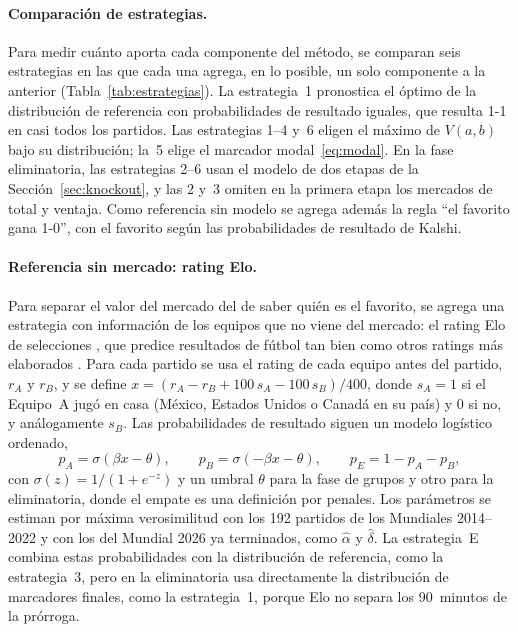 \documentclass[12pt]{article}
\theoremstyle{plain}
\theoremstyle{remark}
\begin{document}
\paragraph{Comparación de estrategias.}
Para medir cuánto aporta cada componente del método, se comparan seis
estrategias en las que cada una agrega, en lo posible, un solo
componente a la anterior (Tabla~\ref{tab:estrategias}).
La estrategia~1 pronostica el óptimo de la distribución de referencia
con probabilidades de resultado iguales, que resulta 1-1 en casi todos
los partidos.
Las estrategias 1--4 y~6 eligen el máximo de $V(a,b)$ bajo su
distribución; la~5 elige el marcador modal~\eqref{eq:modal}.
En la fase eliminatoria, las estrategias 2--6 usan el modelo de dos
etapas de la Sección~\ref{sec:knockout}, y las 2 y~3 omiten en la
primera etapa los mercados de total y ventaja.
Como referencia sin modelo se agrega además la regla ``el favorito
gana 1-0'', con el favorito según las probabilidades de resultado de
Kalshi.

\paragraph{Referencia sin mercado: rating Elo.}
Para separar el valor del mercado del de saber quién es el favorito,
se agrega una estrategia con información de los equipos que no viene
del mercado: el rating Elo de selecciones \citep{eloratings}, que
predice resultados de fútbol tan bien como otros ratings más
elaborados \citep{hvattum2010}.
Para cada partido se usa el rating de cada equipo antes del partido,
$r_A$ y $r_B$, y se define
$x = (r_A - r_B + 100\,s_A - 100\,s_B)/400$, donde $s_A = 1$ si el
Equipo~A jugó en casa (México, Estados Unidos o Canadá en su país) y
0 si no, y análogamente $s_B$.
Las probabilidades de resultado siguen un modelo logístico ordenado,
\begin{equation}
  p_A = \sigma(\beta x - \theta), \qquad
  p_B = \sigma(-\beta x - \theta), \qquad
  p_E = 1 - p_A - p_B,
  \label{eq:elo}
\end{equation}
con $\sigma(z) = 1/(1 + e^{-z})$ y un umbral $\theta$ para la fase de
grupos y otro para la eliminatoria, donde el empate es una definición
por penales.
Los parámetros se estiman por máxima verosimilitud con los 192
partidos de los Mundiales 2014--2022 y con los del Mundial 2026 ya
terminados, como $\hat\alpha$ y $\hat\delta$.
La estrategia~E combina estas probabilidades con la distribución de
referencia, como la estrategia~3, pero en la eliminatoria usa
directamente la distribución de marcadores finales, como la
estrategia~1, porque Elo no separa los 90~minutos de la prórroga.
\end{document}
